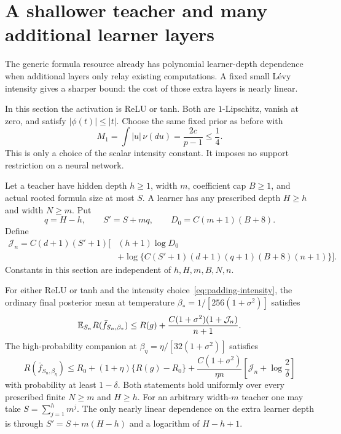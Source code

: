 \section{A shallower teacher and many additional learner layers}
\label{sec:padding}
The generic formula resource already has polynomial learner-depth dependence when additional layers only relay existing computations. A fixed small L\'evy intensity gives a sharper bound: the cost of those extra layers is nearly linear.

In this section the activation is ReLU or tanh. Both are $1$-Lipschitz, vanish at zero, and satisfy $|\phi(t)|\le|t|$. Choose the same fixed prior as before with
\begin{equation}
 M_1=\int|u|\,\nu(du)=\frac{2c}{p-1}\le\frac14.
 \label{eq:padding-intensity}
\end{equation}
This is only a choice of the scalar intensity constant. It imposes no support restriction on a neural network.

Let a teacher have hidden depth $h\ge1$, width $m$, coefficient cap $B\ge1$, and actual rooted formula size at most $S$. A learner has any prescribed depth $H\ge h$ and width $N\ge m$. Put
\[
 q=H-h,\qquad S'=S+mq,\qquad D_0=C(m+1)(B+8).
\]
Define
\begin{align*}
 \mathcal J_n=C(d+1)(S'+1)\big[&(h+1)\log D_0\\
 &+\log\{C(S'+1)(d+1)(q+1)(B+8)(n+1)\}\big].
\end{align*}
Constants in this section are independent of $h,H,m,B,N,n$.

\begin{theorem}
\label{thm:stable-padding}
For either ReLU or tanh and the intensity choice~\eqref{eq:padding-intensity}, the ordinary final posterior mean at temperature $\beta_*=1/[256(1+\sigma^2)]$ satisfies
\[
 \mathbb E_{S_n}R(\bar f_{S_n,\beta_*})
 \le R(g)+\frac{C(1+\sigma^2)(1+\mathcal J_n)}{n+1}.
\]
The high-probability companion at $\beta_\eta=\eta/[32(1+\sigma^2)]$ satisfies
\[
 R(\bar f_{S_n,\beta_\eta})
 \le R_0+(1+\eta)\{R(g)-R_0\}
 +\frac{C(1+\sigma^2)}{\eta n}
       \left[\mathcal J_n+\log\frac2\delta\right]
\]
with probability at least $1-\delta$. Both statements hold uniformly over every prescribed finite $N\ge m$ and $H\ge h$. For an arbitrary width-$m$ teacher one may take $S=\sum_{j=1}^h m^j$. The only nearly linear dependence on the extra learner depth is through $S'=S+m(H-h)$ and a logarithm of $H-h+1$.
\end{theorem}

